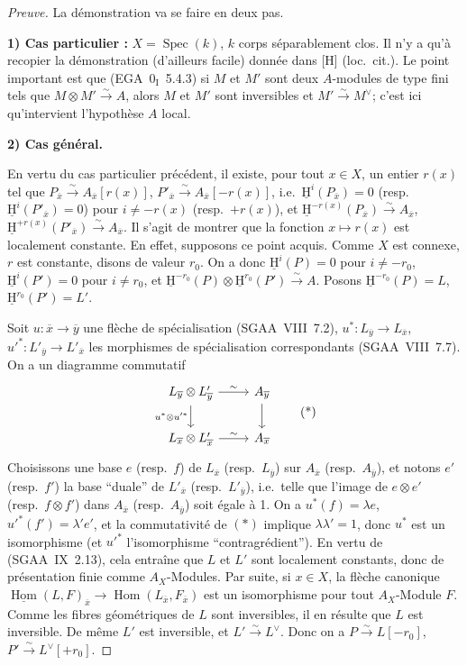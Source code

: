 \documentclass[11pt]{article}
\providecommand{\uH}{\underline{\mathrm H}}
\DeclareMathOperator{\Hom}{Hom}
\DeclareMathOperator{\Spec}{Spec}
\newcommand{\ol}[1]{\overline{#1}}
\providecommand{\Hom}{\operatorname{Hom}}
\providecommand{\Spec}{\operatorname{Spec}}
\providecommand{\Spec}{\operatorname{Spec}}
\providecommand{\Hom}{\operatorname{Hom}}
\providecommand{\Spec}{\operatorname{Spec}}
\providecommand{\Spec}{\operatorname{Spec}}
\begin{document}
\begin{proof}[Preuve]
La démonstration va se faire en deux pas.

\textbf{1) Cas particulier :} $X = \Spec(k)$, $k$ corps séparablement clos. Il n'y a qu'à recopier la démonstration (d'ailleurs facile) donnée dans [H] (loc.~cit.). Le point important est que (EGA~$0_{\mathrm{I}}$~5.4.3) si $M$ et $M'$ sont deux $A$-modules de type fini tels que $M \otimes M' \xrightarrow{\sim} A$, alors $M$ et $M'$ sont inversibles et $M' \xrightarrow{\sim} M^{\vee}$; c'est ici qu'intervient l'hypothèse $A$ local.

\textbf{2) Cas général.}

En vertu du cas particulier précédent, il existe, pour tout $x \in X$, un entier $r(x)$ tel que $P_{\ol{x}} \xrightarrow{\sim} A_{\ol{x}}[r(x)]$, $P'_{\ol{x}} \xrightarrow{\sim} A_{\ol{x}}[-r(x)]$, i.e.~$\uH^i(P_{\ol{x}}) = 0$ (resp.~$\uH^i(P'_{\ol{x}}) = 0$) pour $i \neq -r(x)$ (resp.~$+r(x)$), et $\uH^{-r(x)}(P_{\ol{x}}) \xrightarrow{\sim} A_{\ol{x}}$, $\uH^{+r(x)}(P'_{\ol{x}}) \xrightarrow{\sim} A_{\ol{x}}$. Il s'agit de montrer que la fonction $x \mapsto r(x)$ est localement constante. En effet, supposons ce point acquis. Comme $X$ est connexe, $r$ est constante, disons de valeur $r_0$. On a donc $\uH^i(P) = 0$ pour $i \neq -r_0$, $\uH^i(P') = 0$ pour $i \neq r_0$, et $\uH^{-r_0}(P) \otimes \uH^{r_0}(P') \xrightarrow{\sim} A$. Posons $\uH^{-r_0}(P) = L$, $\uH^{r_0}(P') = L'$.

Soit $u : \ol{x} \to \ol{y}$ une flèche de spécialisation (SGAA~VIII~7.2), $u^{*} : L_{\ol{y}} \to L_{\ol{x}}$, $u'^{*} : L'_{\ol{y}} \to L'_{\ol{x}}$ les morphismes de spécialisation correspondants (SGAA~VIII~7.7). On a un diagramme commutatif
\begin{equation}
\begin{tikzcd}
L_{\ol{y}} \otimes L'_{\ol{y}} \arrow[r,"\sim"] \arrow[d,"u^{*} \otimes u'^{*}"'] & A_{\ol{y}} \arrow[d] \\
L_{\ol{x}} \otimes L'_{\ol{x}} \arrow[r,"\sim"] & A_{\ol{x}}
\end{tikzcd}
\tag{*}
\end{equation}
Choisissons une base $e$ (resp.~$f$) de $L_{\ol{x}}$ (resp.~$L_{\ol{y}}$) sur $A_{\ol{x}}$ (resp.~$A_{\ol{y}}$), et notons $e'$ (resp.~$f'$) la base ``duale'' de $L'_{\ol{x}}$ (resp.~$L'_{\ol{y}}$), i.e.~telle que l'image de $e \otimes e'$ (resp.~$f \otimes f'$) dans $A_{\ol{x}}$ (resp.~$A_{\ol{y}}$) soit égale à 1. On a $u^{*}(f) = \lambda e$, $u'^{*}(f') = \lambda' e'$, et la commutativité de $(*)$ implique $\lambda\lambda' = 1$, donc $u^{*}$ est un isomorphisme (et $u'^{*}$ l'isomorphisme ``contragrédient''). En vertu de (SGAA~IX~2.13), cela entraîne que $L$ et $L'$ sont localement constants, donc de présentation finie comme $A_X$-Modules. Par suite, si $x \in X$, la flèche canonique $\underline{\Hom}(L,F)_{\ol{x}} \to \Hom(L_{\ol{x}}, F_{\ol{x}})$ est un isomorphisme pour tout $A_X$-Module $F$. Comme les fibres géométriques de $L$ sont inversibles, il en résulte que $L$ est inversible. De même $L'$ est inversible, et $L' \xrightarrow{\sim} L^{\vee}$. Donc on a $P \xrightarrow{\sim} L[-r_0]$, $P' \xrightarrow{\sim} L^{\vee}[+r_0]$.


\end{proof}
\end{document}
